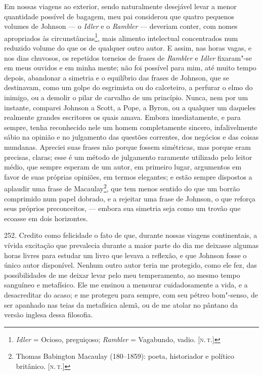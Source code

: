 Em nossas viagens ao exterior, sendo naturalmente desejável levar a
menor quantidade possível de bagagem, meu pai considerou que quatro
pequenos volumes de Johnson --- o \emph{Idler} e o \emph{Rambler} ---
deveriam conter, com nomes apropriados às circunstâncias\footnote{\emph{Idler}
  = Ocioso, preguiçoso; \emph{Rambler} = Vagabundo, vadio. {[}\textsc{n.\,t.}{]}}, mais alimento intelectual concentrados num reduzido volume do
que os de qualquer outro autor. E assim, nas horas vagas, e nos dias
chuvosos, os repetidos torneios de frases de \emph{Rambler} e
\emph{Idler} fixaram"-se em meus ouvidos e em minha mente; não foi
possível para mim, até muito tempo depois, abandonar a simetria e o
equilíbrio das frases de Johnson, que se destinavam, como um golpe do
esgrimista ou do calceteiro, a perfurar o elmo do inimigo, ou a demolir
o pilar de carvalho de um princípio. Nunca, nem por um instante,
comparei Johnson a Scott, a Pope, a Byron, ou a qualquer um daqueles
realmente grandes escritores os quais amava. Embora imediatamente, e
para sempre, tenha reconhecido nele um homem completamente sincero,
infalivelmente sábio na opinião e no julgamento das questões correntes,
dos negócios e das coisas mundanas. Apreciei suas frases não porque
fossem simétricas, mas porque eram precisas, claras; esse é um método de
julgamento raramente utilizado pelo leitor médio, que sempre esperam de
um autor, em primeiro lugar, argumentos em favor de suas próprias
opiniões, em termos elegantes; e estão sempre dispostos a aplaudir uma
frase de Macaulay\footnote{Thomas Babington Macaulay (180--1859): poeta,
  historiador e político britânico. {[}\textsc{n.\,t.}{]}}, que tem menos
sentido do que um borrão comprimido num papel dobrado, e a rejeitar uma
frase de Johnson, o que reforça seus próprios preconceitos, --- embora
sua simetria seja como um trovão que ecoasse em dois horizontes.

252. Credito como felicidade o fato de que, durante nossas viagens
continentais, a vívida excitação que prevalecia durante a maior parte do
dia me deixasse algumas horas livres para estudar um livro que levava a
reflexão, e que Johnson fosse o único autor disponível. Nenhum outro
autor teria me protegido, como ele fez, das possibilidades de me deixar
levar pelo meu temperamento, ao mesmo tempo sanguíneo e metafísico. Ele
me ensinou a mensurar cuidadosamente a vida, e a desacreditar do acaso;
e me protegeu para sempre, com seu pétreo bom"-senso, de ser apanhado nas
teias da metafísica alemã, ou de me atolar no pântano da versão inglesa
dessa filosofia.

